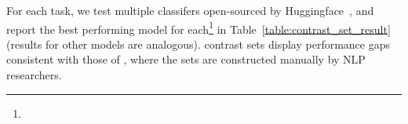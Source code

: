 For each task, we test multiple classifers open-sourced by Huggingface~\cite{Wolf2019HuggingFacesTS}, and report the best performing model for each\footnote{} in Table~\ref{table:contrast_set_result} (results for other models are analogous). \sysname contrast sets display performance gaps consistent with those of \citet{gardner2020contrast}, where the sets are constructed manually by NLP researchers.

\TableContrastSet




\TableAugSST
\TableAugNLI
\TableAugQQP
